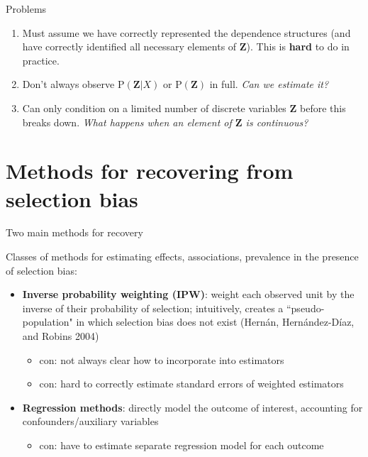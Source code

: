 \documentclass[
  ignorenonframetext,
]{beamer}
\providecommand{\tightlist}{%
  \setlength{\itemsep}{0pt}\setlength{\parskip}{0pt}}
\begin{document}
\begin{frame}{Problems}
\protect\hypertarget{problems}{}

\begin{enumerate}
\item
  Must assume we have correctly represented the dependence structures
  (and have correctly identified all necessary elements of
  \(\mathbf{Z}\)). This is \textbf{hard} to do in practice.
\item
  Don't always observe \(\text{P}(\mathbf{Z} | X)\) or
  \(\text{P}(\mathbf{Z})\) in full. \emph{Can we estimate it?}
\item
  Can only condition on a limited number of discrete variables
  \(\mathbf{Z}\) before this breaks down. \emph{What happens when an
  element of \(\mathbf{Z}\) is continuous?}
\end{enumerate}

\end{frame}

\hypertarget{methods-for-recovering-from-selection-bias}{%
\section{Methods for recovering from selection
bias}\label{methods-for-recovering-from-selection-bias}}

\begin{frame}{Two main methods for recovery}
\protect\hypertarget{two-main-methods-for-recovery}{}

Classes of methods for estimating effects, associations, prevalence in
the presence of selection bias:

\begin{itemize}
\tightlist
\item
  \textbf{Inverse probability weighting (IPW)}: weight each observed
  unit by the inverse of their probability of selection; intuitively,
  creates a ``pseudo-population" in which selection bias does not exist
  (Hernán, Hernández-Díaz, and Robins 2004)

  \begin{itemize}
  \tightlist
  \item
    con: not always clear how to incorporate into estimators
  \item
    con: hard to correctly estimate standard errors of weighted
    estimators
  \end{itemize}
\item
  \textbf{Regression methods}: directly model the outcome of interest,
  accounting for confounders/auxiliary variables

  \begin{itemize}
  \tightlist
  \item
    con: have to estimate separate regression model for each outcome
  \end{itemize}
\end{itemize}

\end{frame}
\end{document}
